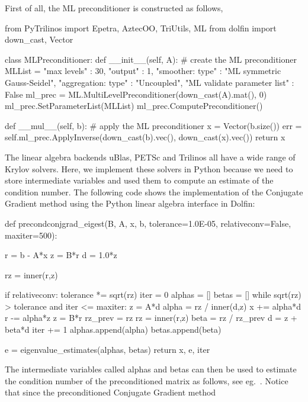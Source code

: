 First of all, the ML preconditioner is constructed as follows,  
\begin{python}
from PyTrilinos import Epetra, AztecOO, TriUtils, ML 
from dolfin import down_cast, Vector 

class MLPreconditioner: 
    def __init__(self, A): 
        # create the ML preconditioner
        MLList = {
              "max levels"        : 30, 
              "output"            : 1,  
              "smoother: type"    : "ML symmetric Gauss-Seidel",
              "aggregation: type" : "Uncoupled",
              "ML validate parameter list" : False
        }
        ml_prec = ML.MultiLevelPreconditioner(down_cast(A).mat(), 0)
        ml_prec.SetParameterList(MLList)
        ml_prec.ComputePreconditioner()

    def __mul__(self, b):
        # apply the ML preconditioner
        x = Vector(b.size())
        err = self.ml_prec.ApplyInverse(down_cast(b).vec(),
                                        down_cast(x).vec())
        return x
\end{python}
The linear algebra backends uBlas, PETSc and Trilinos all have 
a wide range of Krylov solvers. Here, we implement
these solvers in Python because we need to store intermediate
variables and  used them to compute an estimate of the condition number. 
The following code shows the implementation of the Conjugate Gradient method
using the Python linear algebra interface in Dolfin:
\begin{python}
def precondconjgrad_eigest(B, A, x, b, tolerance=1.0E-05, 
                           relativeconv=False, maxiter=500):

    r = b - A*x
    z = B*r
    d = 1.0*z

    rz = inner(r,z)

    if relativeconv: tolerance *= sqrt(rz)
    iter = 0
    alphas = []
    betas = []
    while sqrt(rz) > tolerance and iter <= maxiter:
        z = A*d
        alpha = rz / inner(d,z)
        x += alpha*d
        r -= alpha*z
        z = B*r
        rz_prev = rz
        rz = inner(r,z)
        beta =  rz / rz_prev
        d = z + beta*d
        iter += 1
        alphas.append(alpha)
        betas.append(beta)

    e = eigenvalue_estimates(alphas, betas)
    return x, e, iter
\end{python}
The intermediate variables called alphas and betas can then be used to estimate the condition number of
the preconditioned matrix as follows, see eg.~\cite{Saad2003}. 
Notice that since the preconditioned Conjugate Gradient method 
